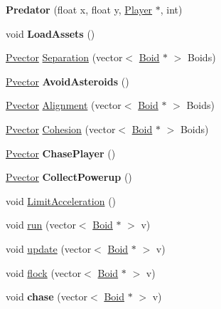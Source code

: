 \begin{DoxyCompactItemize}
\item 
{\bfseries Predator} (float x, float y, \hyperlink{class_player}{Player} $\ast$, int)\hypertarget{class_predator_a07d4dc6bd3e422d16dfa9fe583330a77}{}\label{class_predator_a07d4dc6bd3e422d16dfa9fe583330a77}

\item 
void {\bfseries Load\+Assets} ()\hypertarget{class_predator_aa2b53123af3c2fbbaa57d3c786579d5b}{}\label{class_predator_aa2b53123af3c2fbbaa57d3c786579d5b}

\item 
\hyperlink{class_pvector}{Pvector} \hyperlink{class_predator_a39709215e0af7c6d6842dac7ea26c785}{Separation} (vector$<$ \hyperlink{class_boid}{Boid} $\ast$ $>$ Boids)
\item 
\hyperlink{class_pvector}{Pvector} {\bfseries Avoid\+Asteroids} ()\hypertarget{class_predator_a4fb9706ecbd7b89c72d322270b6a3548}{}\label{class_predator_a4fb9706ecbd7b89c72d322270b6a3548}

\item 
\hyperlink{class_pvector}{Pvector} \hyperlink{class_predator_a468cabfeb5853a46ec9cc7981c93177c}{Alignment} (vector$<$ \hyperlink{class_boid}{Boid} $\ast$ $>$ Boids)
\item 
\hyperlink{class_pvector}{Pvector} \hyperlink{class_predator_a394fda92031d5703c78c12a207b3f18b}{Cohesion} (vector$<$ \hyperlink{class_boid}{Boid} $\ast$ $>$ Boids)
\item 
\hyperlink{class_pvector}{Pvector} {\bfseries Chase\+Player} ()\hypertarget{class_predator_a2657838b5bfc93ec396428f3dbc49635}{}\label{class_predator_a2657838b5bfc93ec396428f3dbc49635}

\item 
\hyperlink{class_pvector}{Pvector} {\bfseries Collect\+Powerup} ()\hypertarget{class_predator_a6bfdec84ee33ec37f0b7f992ee033c80}{}\label{class_predator_a6bfdec84ee33ec37f0b7f992ee033c80}

\item 
void \hyperlink{class_predator_a87852c5b5f7a4fd0a00cc775cfe3bed7}{Limit\+Acceleration} ()
\item 
void \hyperlink{class_predator_a0cad59d52edbb2ba808971ff116b2f0b}{run} (vector$<$ \hyperlink{class_boid}{Boid} $\ast$ $>$ v)
\item 
void \hyperlink{class_predator_a30cfc426131aaa9300435185830d0ebe}{update} (vector$<$ \hyperlink{class_boid}{Boid} $\ast$ $>$ v)
\item 
void \hyperlink{class_predator_ac7d906a6fef7ec8d152af0d8c199a100}{flock} (vector$<$ \hyperlink{class_boid}{Boid} $\ast$ $>$ v)
\item 
void {\bfseries chase} (vector$<$ \hyperlink{class_boid}{Boid} $\ast$ $>$ v)\hypertarget{class_predator_af0e9aefb6652b21365ce26142f903331}{}\label{class_predator_af0e9aefb6652b21365ce26142f903331}


\end{DoxyCompactItemize}
